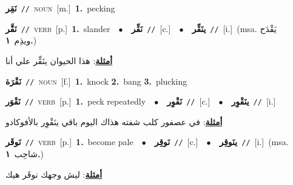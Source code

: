 \documentclass[10pt,a4paper,twoside]{article} %
\begin{document}
\begin{multicols}{2}
{\setlength\topsep{0pt}\textbf{\foreignlanguage{arabic}{نَقِر}}\ {\color{gray}\texttt{//}\color{black}}\ \textsc{noun}\ [m.]\ \textbf{1.}~pecking\ } \vspace{2mm}

{\setlength\topsep{0pt}\textbf{\foreignlanguage{arabic}{نَقَّر}}\ {\color{gray}\texttt{//}\color{black}}\ \textsc{verb}\ [p.]\ \textbf{1.}~slander\ \ $\bullet$\ \ \setlength\topsep{0pt}\textbf{\foreignlanguage{arabic}{نَقِّر}}\ {\color{gray}\texttt{//}\color{black}}\ [c.]\ \ $\bullet$\ \ \setlength\topsep{0pt}\textbf{\foreignlanguage{arabic}{ينَقِّر}}\ {\color{gray}\texttt{//}\color{black}}\ [i.]\ \color{gray}(msa. \foreignlanguage{arabic}{يَقْدَح ويذِم}~\foreignlanguage{arabic}{\textbf{١.}})\color{black}\  \begin{flushright}\color{gray}\foreignlanguage{arabic}{\textbf{\underline{\foreignlanguage{arabic}{أمثلة}}}: هذا الحيوان ينَقِّر علي أنا}\end{flushright}\color{black}} \vspace{2mm}

{\setlength\topsep{0pt}\textbf{\foreignlanguage{arabic}{نَقْرَة}}\ {\color{gray}\texttt{//}\color{black}}\ \textsc{noun}\ [f.]\ \textbf{1.}~knock  \textbf{2.}~bang  \textbf{3.}~plucking\ } \vspace{2mm}

{\setlength\topsep{0pt}\textbf{\foreignlanguage{arabic}{نَقْوَر}}\ {\color{gray}\texttt{//}\color{black}}\ \textsc{verb}\ [p.]\ \textbf{1.}~peck repeatedly\ \ $\bullet$\ \ \setlength\topsep{0pt}\textbf{\foreignlanguage{arabic}{نَقْوِر}}\ {\color{gray}\texttt{//}\color{black}}\ [c.]\ \ $\bullet$\ \ \setlength\topsep{0pt}\textbf{\foreignlanguage{arabic}{ينَقْوِر}}\ {\color{gray}\texttt{//}\color{black}}\ [i.]\  \begin{flushright}\color{gray}\foreignlanguage{arabic}{\textbf{\underline{\foreignlanguage{arabic}{أمثلة}}}: في عصفور كلب شفته هذاك اليوم باقي ينَقْوِر بالأفوكادو}\end{flushright}\color{black}} \vspace{2mm}

{\setlength\topsep{0pt}\textbf{\foreignlanguage{arabic}{نَوقَر}}\ {\color{gray}\texttt{//}\color{black}}\ \textsc{verb}\ [p.]\ \textbf{1.}~become pale\ \ $\bullet$\ \ \setlength\topsep{0pt}\textbf{\foreignlanguage{arabic}{نَوقِر}}\ {\color{gray}\texttt{//}\color{black}}\ [c.]\ \ $\bullet$\ \ \setlength\topsep{0pt}\textbf{\foreignlanguage{arabic}{ينَوقِر}}\ {\color{gray}\texttt{//}\color{black}}\ [i.]\ \color{gray}(msa. \foreignlanguage{arabic}{شاحِب}~\foreignlanguage{arabic}{\textbf{١.}})\color{black}\  \begin{flushright}\color{gray}\foreignlanguage{arabic}{\textbf{\underline{\foreignlanguage{arabic}{أمثلة}}}: ليش وجهك نوقَر هيك}\end{flushright}\color{black}} \vspace{2mm}


\end{multicols}
\end{document}
